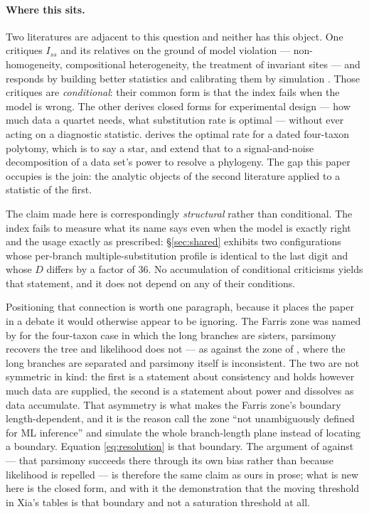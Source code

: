 \documentclass[preprint,12pt,authoryear]{elsarticle}
\newcommand{\Iss}{I_{ss}}
\theoremstyle{definition}
\theoremstyle{remark}
\begin{document}
\paragraph{Where this sits.} Two literatures are adjacent to this question
and neither has this object. One critiques $\Iss$ and its relatives on the
ground of model violation --- non-homogeneity, compositional heterogeneity,
the treatment of invariant sites --- and responds by building better
statistics and calibrating them by simulation
\citep{jermiin2020signal,duchene2022saturation}. Those critiques are
\emph{conditional}: their common form is that the index fails when the model
is wrong. The other derives closed forms for experimental design --- how much
data a quartet needs, what substitution rate is optimal --- without ever
acting on a diagnostic statistic. \citet{townsend2007} derives the optimal
rate for a dated four-taxon polytomy, which is to say a star, and
\citet{townsend2012} extend that to a signal-and-noise decomposition of a data
set's power to resolve a phylogeny. The gap this paper occupies is the join:
the analytic objects of the second literature applied to a statistic of the
first.

The claim made here is correspondingly \emph{structural} rather than
conditional. The index fails to measure what its name says even when the
model is exactly right and the usage exactly as prescribed:
\S\ref{sec:shared} exhibits two configurations whose per-branch
multiple-substitution profile is identical to the last digit and whose
$D$ differs by a factor of $36$. No accumulation of conditional
criticisms yields that statement, and it does not depend on any of their
conditions.

Positioning that connection is worth one paragraph, because it places the
paper in a debate it would otherwise appear to be ignoring. The Farris zone
was named by \citet{siddall1998} for the four-taxon case in which the long
branches are sisters, parsimony recovers the tree and likelihood does not ---
as against the zone of \citet{felsenstein1978}, where the long branches are
separated and parsimony itself is inconsistent. The two are not symmetric in
kind: the first is a statement about consistency and holds however much data
are supplied, the second is a statement about power and dissolves as data
accumulate. That asymmetry is what makes the Farris zone's boundary
length-dependent, and it is the reason \citet{leuchtenberger2020} call the
zone ``not unambiguously defined for ML inference'' and simulate the whole
branch-length plane instead of locating a boundary. Equation
\eqref{eq:resolution} is that boundary. The argument of
\citet{swofford2001} against \citet{siddall1998} --- that parsimony succeeds
there through its own bias rather than because likelihood is repelled --- is
therefore the same claim as ours in prose; what is new here is the closed
form, and with it the demonstration that the moving threshold in Xia's tables
is that boundary and not a saturation threshold at all.
\end{document}
